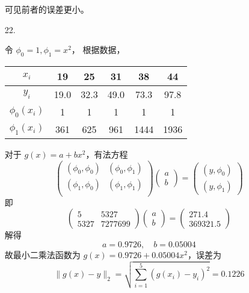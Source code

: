 \documentclass{sjtuarticle}
\begin{document}
\begin{itemize}
\begin{solution}
\begin{itemize}
        \end{itemize}
        可见前者的误差更小。
    \end{solution}
    \item[22.] \begin{solution}
        令 $\phi_0=1,\phi_1=x^2$，
        根据数据，
        \begin{table}[H]
            \centering
            \begin{tabular}{cccccc}
                \toprule
$x_i$ & 19   & 25   & 31   & 38   & 44   \\
\midrule
$y_i$ & 19.0 & 32.3 & 49.0 & 73.3 & 97.8 \\
$\phi_0(x_i)$ & 1 & 1 & 1 & 1 & 1 \\
$\phi_1(x_i)$ & 361 & 625 & 961 & 1444 & 1936 \\
\bottomrule
            \end{tabular}
        \end{table}
        对于 $g(x)=a+bx^2$，有法方程
        \begin{equation*}
            \begin{pmatrix}
                (\phi_0,\phi_0) & (\phi_0,\phi_1) \\
                (\phi_1,\phi_0) & (\phi_1,\phi_1) \\
            \end{pmatrix}
            \begin{pmatrix}
                a \\ b
            \end{pmatrix}=
            \begin{pmatrix}
                (y,\phi_0) \\ (y,\phi_1)
            \end{pmatrix}
        \end{equation*}
        即
        \begin{equation*}
            \begin{pmatrix}
                5 & 5327 \\
                5327 & 7277699
            \end{pmatrix}
            \begin{pmatrix}
                a \\ b
            \end{pmatrix}=\begin{pmatrix}
                271.4 \\ 369321.5
            \end{pmatrix}
        \end{equation*}
        解得
        \begin{equation*}
            a = 0.9726,\quad b = 0.05004
        \end{equation*}
        故最小二乘法函数为 $g(x)=0.9726+ 0.05004x^2$，误差为
        \begin{equation*}
            \lVert g(x)-y \rVert_2=\sqrt{\sum_{i=1}^{5} (g(x_i)-y_i)^2}=0.1226
        \end{equation*}
    \end{solution}
\end{itemize}
\end{document}
